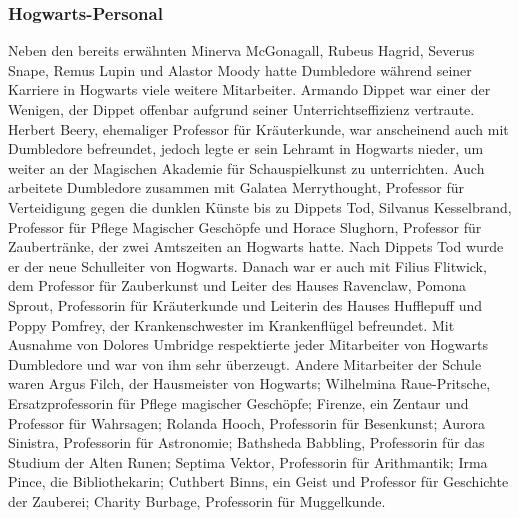 \documentclass[a4paper, 10pt]{article}
\begin{document}
\subsubsection*{\large Hogwarts-Personal}
Neben den bereits erwähnten Minerva McGonagall, Rubeus Hagrid, Severus Snape, Remus Lupin und Alastor Moody hatte Dumbledore während seiner Karriere in Hogwarts viele weitere Mitarbeiter. Armando Dippet war einer der Wenigen, der Dippet offenbar aufgrund seiner Unterrichtseffizienz vertraute. Herbert Beery, ehemaliger Professor für Kräuterkunde, war anscheinend auch mit Dumbledore befreundet, jedoch legte er sein Lehramt in Hogwarts nieder, um weiter an der Magischen Akademie für Schauspielkunst zu unterrichten. Auch arbeitete Dumbledore zusammen mit Galatea Merrythought, Professor für Verteidigung gegen die dunklen Künste bis zu Dippets Tod, Silvanus Kesselbrand, Professor für Pflege Magischer Geschöpfe und Horace Slughorn, Professor für Zaubertränke, der zwei Amtszeiten an Hogwarts hatte.
\vspace{10pt}
\newline
{}  
Nach Dippets Tod wurde er der neue Schulleiter von Hogwarts. Danach war er auch mit Filius Flitwick, dem Professor für Zauberkunst und Leiter des Hauses Ravenclaw, Pomona Sprout, Professorin für Kräuterkunde und Leiterin des Hauses Hufflepuff und Poppy Pomfrey, der Krankenschwester im Krankenflügel befreundet.
\vspace{10pt}
\newline
{}  
Mit Ausnahme von Dolores Umbridge respektierte jeder Mitarbeiter von Hogwarts Dumbledore und war von ihm sehr überzeugt. Andere Mitarbeiter der Schule waren Argus Filch, der Hausmeister von Hogwarts; Wilhelmina Raue-Pritsche, Ersatzprofessorin für Pflege magischer Geschöpfe; Firenze, ein Zentaur und Professor für Wahrsagen; Rolanda Hooch, Professorin für Besenkunst; Aurora Sinistra, Professorin für Astronomie; Bathsheda Babbling, Professorin für das Studium der Alten Runen; Septima Vektor, Professorin für Arithmantik; Irma Pince, die Bibliothekarin; Cuthbert Binns, ein Geist und Professor für Geschichte der Zauberei; Charity Burbage, Professorin für Muggelkunde.
\vspace{10pt}
\newline
{}  
\end{document}
